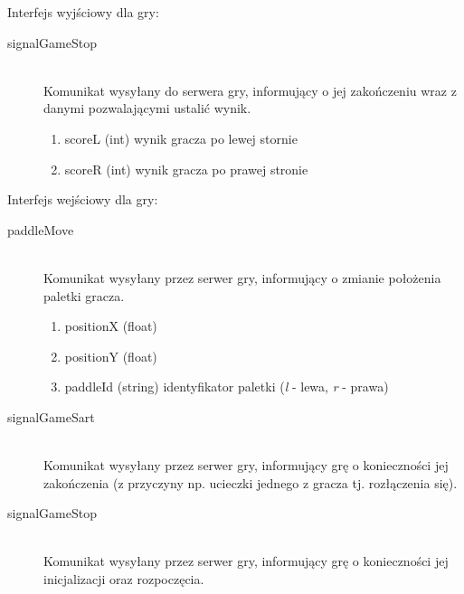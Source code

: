 Interfejs wyjściowy dla gry:

\begin{description}
	\item[signalGameStop] \hfill \\
	Komunikat wysyłany do serwera gry, informujący o jej zakończeniu wraz z danymi pozwalającymi ustalić wynik.
	\begin{enumerate}
		\item scoreL (int) wynik gracza po lewej stornie
		\item scoreR (int) wynik gracza po prawej stronie
	\end{enumerate}
\end{description}

Interfejs wejściowy dla gry:

\begin{description}
	\item[paddleMove] \hfill \\
	Komunikat wysyłany przez serwer gry, informujący o zmianie położenia paletki gracza.
	\begin{enumerate}
		\item positionX (float)
		\item positionY (float)
		\item paddleId (string) identyfikator paletki (\emph{l} - lewa, \emph{r} - prawa)
	\end{enumerate}
\end{description}

\begin{description}
	\item[signalGameSart] \hfill \\
	Komunikat wysyłany przez serwer gry, informujący grę o konieczności jej zakończenia (z przyczyny np. ucieczki jednego z gracza tj. rozłączenia się).
\end{description}

\begin{description}
	\item[signalGameStop] \hfill \\
	Komunikat wysyłany przez serwer gry, informujący grę o konieczności jej inicjalizacji oraz rozpoczęcia.
\end{description}
